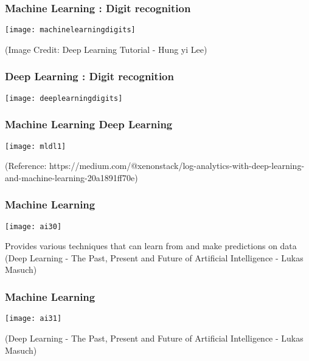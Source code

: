 \begin{frame}[fragile] \frametitle{Machine Learning : Digit recognition}
\begin{center}
\texttt{[image: machinelearningdigits]}
\end{center}
{\tiny (Image Credit: Deep Learning Tutorial - Hung yi Lee)}
\end{frame}

\begin{frame}[fragile] \frametitle{Deep Learning : Digit recognition}
\begin{center}
\texttt{[image: deeplearningdigits]}
\end{center}

\end{frame}

\begin{frame}[fragile]\frametitle{Machine Learning Deep Learning}
\begin{center}
\texttt{[image: mldl1]}
\end{center}
\tiny{(Reference: https://medium.com/@xenonstack/log-analytics-with-deep-learning-and-machine-learning-20a1891ff70e)}
\end{frame}

\begin{frame}[fragile] \frametitle{Machine Learning}
\begin{center}
\texttt{[image: ai30]}
\end{center}
Provides various techniques that can learn from and make predictions on data
{\tiny (Deep Learning - The Past, Present and Future of Artificial Intelligence - Lukas Masuch)}
\end{frame}

\begin{frame}[fragile] \frametitle{Machine Learning}
\begin{center}
\texttt{[image: ai31]}
\end{center}
{\tiny (Deep Learning - The Past, Present and Future of Artificial Intelligence - Lukas Masuch)}
\end{frame}

